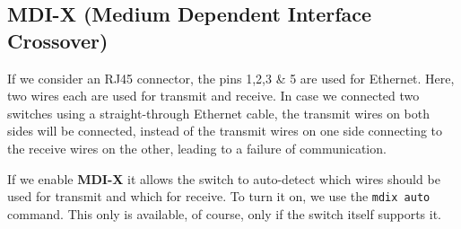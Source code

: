 \subsection{MDI-X (Medium Dependent Interface Crossover)}
If we consider an RJ45 connector, the pins 1,2,3 \& 5 are used for Ethernet. Here, two wires each are used for transmit and receive. In case we connected two switches using a straight-through Ethernet cable, the transmit wires on both sides will be connected, instead of the transmit wires on one side connecting to the receive wires on the other, leading to a failure of communication. 

If we enable \textbf{MDI-X} it allows the switch to auto-detect which wires should be used for transmit and which for receive. To turn it on, we use the \verb|mdix auto| command. This only is available, of course, only if the switch itself supports it. 
